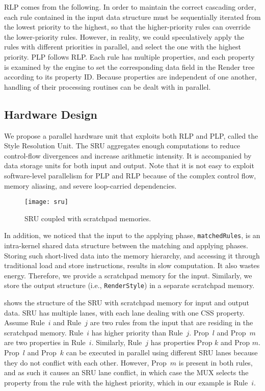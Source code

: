 RLP comes from the following. In order to maintain the correct cascading order, each rule contained in the input data structure must be sequentially iterated from the lowest priority to the highest, so that the higher-priority rules can override the lower-priority rules. However, in reality, we could speculatively apply the rules with different priorities in parallel, and select the one with the highest priority. PLP follows RLP. Each rule has multiple properties, and each property is examined by the engine to set the corresponding data field in the Render tree according to its property ID. Because properties are independent of one another, handling of their processing routines can be dealt with in parallel.

\subsection{Hardware Design}
\label{sec:sru:hw}

We propose a parallel hardware unit that exploits both RLP and PLP, called the Style Resolution Unit. The SRU aggregates enough computations to reduce control-flow divergences and increase arithmetic intensity. It is accompanied by data storage units for both input and output. Note that it is not easy to exploit software-level parallelism for PLP and RLP because of the complex control flow, memory aliasing, and severe loop-carried dependencies.

\begin{figure}[t]
\centering
\texttt{[image: sru]}
\caption{\small{SRU coupled with scratchpad memories.}}
\label{fig:sru}
\end{figure}

In addition, we noticed that the input to the applying phase, \texttt{matchedRules}, is an intra-kernel shared data structure between the matching and applying phases. Storing such short-lived data into the memory hierarchy, and accessing it through traditional load and store instructions, results in slow computation. It also wastes energy. Therefore, we provide a scratchpad memory for the input. Similarly, we store the output structure (i.e., \texttt{RenderStyle}) in a separate scratchpad memory.

 shows the structure of the SRU with scratchpad memory for input and output data. SRU has multiple lanes, with each lane dealing with one CSS property. Assume Rule~$i$ and Rule~$j$ are two rules from the input that are residing in the scratchpad memory. Rule~$i$ has higher priority than Rule~$j$. Prop~$l$ and Prop~$m$ are two properties in Rule~$i$. Similarly, Rule~$j$ has properties Prop $k$ and Prop $m$. Prop~$l$ and Prop~$k$ can be executed in parallel using different SRU lanes because they do not conflict with each other. However, Prop~$m$ is present in both rules, and as such it causes an SRU lane conflict, in which case the MUX selects the property from the rule with the highest priority, which in our example is Rule~$i$.

